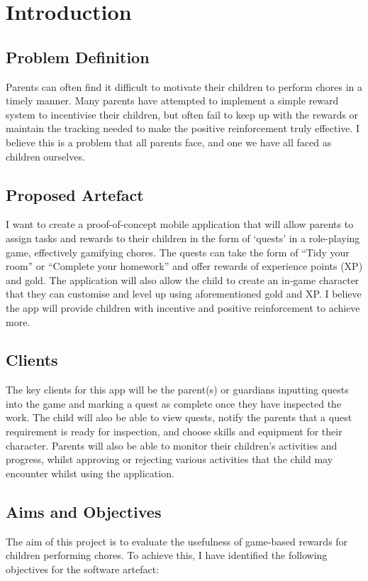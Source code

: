 \chapter{Introduction}
\label{chap:intro}

\section{Problem Definition}
Parents can often find it difficult to motivate their children to perform chores in a timely manner. 
Many parents have attempted to implement a simple reward system to incentivise their children, but often fail to keep up with the rewards or maintain the tracking needed to make the positive reinforcement truly effective.
I believe this is a problem that all parents face, and one we have all faced as children ourselves.  

\section{Proposed Artefact}
I want to create a proof-of-concept mobile application that will allow parents to assign tasks and rewards to their children in the form of `quests' in a role-playing game, effectively gamifying chores. 
The quests can take the form of ``Tidy your room'' or ``Complete your homework'' and offer rewards of experience points (XP) and gold. The application will also allow the child to create an in-game character that they can customise and level up using aforementioned gold and XP.
I believe the app will provide children with incentive and positive reinforcement to achieve more.

\section{Clients}
The key clients for this app will be the parent(s) or guardians inputting quests into the game and marking a quest as complete once they have inspected the work. 
The child will also be able to view quests, notify the parents that a quest requirement is ready for inspection, and choose skills and equipment for their character.
Parents will also be able to monitor their children's activities and progress, whilst approving or rejecting various activities that the child may encounter whilst using the application. 

\section{Aims and Objectives}
The aim of this project is to evaluate the usefulness of game-based rewards for children performing chores. 
To achieve this, I have identified the following objectives for the software artefact:

